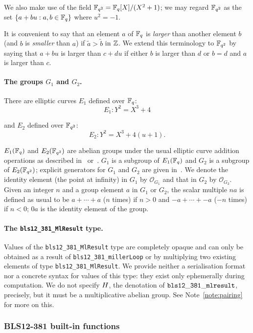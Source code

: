 We also make use of the field $\mathbb{F}_{q^2} = \mathbb{F}_q[X]/(X^2+1)$; we may regard $\mathbb{F}_{q^2}$ as
the set $\{a+bu: a,b \in \mathbb{F}_q\}$ where $u^2=-1$.

It is convenient to say that an element $a$ of $\mathbb{F}_q$ is \textit{larger} than
another element $b$ (and $b$ is \textit{smaller} than $a$) if $\tilde{a}
> \tilde{b}$ in $\mathbb{Z}$.  We extend this terminology to $\mathbb{F}_{q^2}$ by saying that
$a+bu$ is larger than $c+du$ if either $b$ is larger than $d$ or $b=d$ and $a$
is larger than $c$.


\paragraph{The groups $G_1$ and $G_2$.}
\noindent There are elliptic curves $E_1$ defined over $\mathbb{F}_q$:
$$
E_1: Y^2 = X^3 + 4
$$

\noindent and $E_2$ defined over $\mathbb{F}_{q^2}$:
$$
E_2: Y^2 = X^3 + 4(u+1).
$$

\noindent $E_1(\mathbb{F}_q)$ and  $E_2(\mathbb{F}_{q^2})$  are abelian groups under the
usual elliptic curve addition operations as described
in~\cite[III.2]{Silverman-Arithmetic-EC} or~\cite[2.1]{Costello-pairings}.
$G_1$ is a subgroup of $E_1(\mathbb{F}_q)$ and $G_2$ is a subgroup of $E_2(\mathbb{F}_{q^2})$;
explicit generators for $G_1$ and $G_2$ are given
in~\cite[4.2.1]{IETF-pairing-friendly-curves}.  We denote the identity element
(the point at infinity) in $G_1$ by $\mathcal{O}_{G_1}$ and that in $G_2$ by
$\mathcal{O}_{G_2}$.  Given an integer $n$ and a group element $a$ in $G_1$ or
$G_2$, the scalar multiple $na$ is defined as usual to be $a + \cdots + a$ ($n$
times) if $n>0$ and $-a + \cdots + -a$ ($-n$ times) if $n<0$; $0a$ is the
identity element of the group.

\paragraph{The \texttt{bls12\_381\_MlResult} type.}
\noindent Values of the \texttt{bls12\_381\_MlResult} type are completely
opaque and can only be obtained as a result of \texttt{bls12\_381\_millerLoop}
or by multiplying two existing elements of type \texttt{bls12\_381\_MlResult}.
We provide neither a serialisation format nor a concrete syntax for values of
this type: they exist only ephemerally during computation.  We do not specify
$H$, the denotation of $\mathtt{bls12\_381\_mlresult}$, precisely, but it
must be a multiplicative abelian group. See Note~\ref{note:pairing} for more on
this.

\subsubsection{BLS12-381 built-in functions}
\label{sec:bls-builtins-4}

